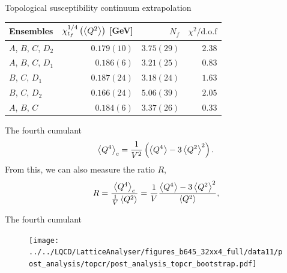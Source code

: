 \documentclass[10pt,show notes on second screen]{beamer}
\begin{document}
\begin{frame}{Topological susceptibility continuum extrapolation}
\begin{table}
    \centering
    \begin{tabular}{l r r r}
        \toprule
        Ensembles               & $\chi_{t_f}^{1/4}\left( \left\langle{Q^2}\right\rangle \right)$ [GeV]   & $N_f$         & $\chi^2/\mathrm{d.o.f}$ \\ \midrule
        $A$, $B$, $C$, $D_2$    & $0.179(10)$                                           & $3.75(29)$    & $2.38$ \\
        $A$, $B$, $C$, $D_1$    & $0.186(6)$                                            & $3.21(25)$    & $0.83$ \\
        $B$, $C$, $D_1$         & $0.187(24)$                                           & $3.18(24)$    & $1.63$ \\ 
        $B$, $C$, $D_2$         & $0.166(24)$                                           & $5.06(39)$    & $2.05$ \\ 
        $A$, $B$, $C$           & $0.184(6)$                                            & $3.37(26)$    & $0.33$ \\
        \bottomrule
    \end{tabular}
\end{table}
\end{frame}

\begin{frame}{The fourth cumulant}
\begin{align*}
    \left\langle{Q^4}\right\rangle_c = \frac{1}{V^2}\left(\left\langle{Q^4}\right\rangle - 3\left\langle{Q^2}\right\rangle^2\right).
\end{align*}
From this, we can also measure the ratio $R$,
\begin{align*}
    R = \frac{\left\langle{Q^4}\right\rangle_c}{\frac{1}{V}\left\langle{Q^2}\right\rangle} = \frac{1}{V}\frac{\left\langle{Q^4}\right\rangle - 3\left\langle{Q^2}\right\rangle^2}{\left\langle{Q^2}\right\rangle},
\end{align*}
\end{frame}

\begin{frame}{The fourth cumulant}
\begin{figure}
    \centering
    \texttt{[image: ../../LQCD/LatticeAnalyser/figures\_b645\_32xx4\_full/data11/post\_analysis/topcr/post\_analysis\_topcr\_bootstrap.pdf]}
\end{figure}
\end{frame}
\end{document}
